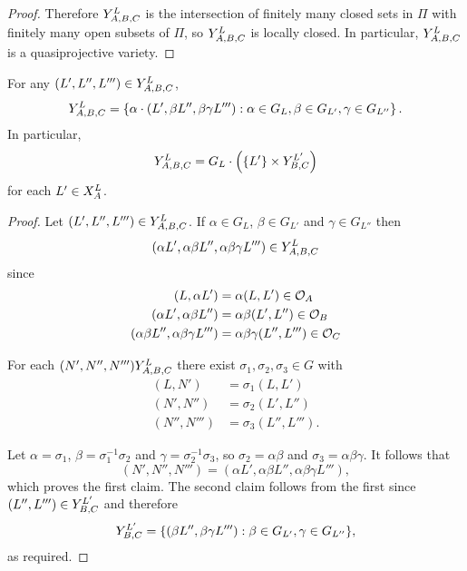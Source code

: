 \documentclass[a4paper, 11pt, twoside]{report}
\begin{document}
\begin{proof}
Therefore $\yprod[L]{A,B,C}$ is the intersection of finitely many closed sets in $\Pi$ with finitely many open subsets of $\Pi$, so $\yprod[L]{A,B,C}$ is locally closed. In particular, $\yprod[L]{A,B,C}$ is a quasiprojective variety.
\end{proof}

\begin{lemma}\label{lemma:y-triple-stabilisers}
For any $(L',L'',L''')\in\yprod[L]{A,B,C}$,
\begin{equation*}
\yprod[L]{A,B,C} = \left\{ \alpha\cdot (L',\beta L'',\beta\gamma L'''): \alpha\in G_L, \beta\in G_{L'}, \gamma\in G_{L''}\right\}.
\end{equation*}
In particular,
\begin{equation*}
\yprod[L]{A,B,C} = G_L\cdot\left(\{L'\}\times\yprod[L']{B,C}\right)
\end{equation*}
for each $L'\in\xprod[L]{A}$.
\end{lemma}

\begin{proof}
Let $(L',L'',L''')\in\yprod[L]{A,B,C}$. If $\alpha\in G_{L}$, $\beta\in G_{L'}$ and $\gamma\in G_{L''}$ then
\begin{equation*}
(\alpha L',\alpha\beta L'', \alpha\beta\gamma L''')\in\yprod[L]{A,B,C}
\end{equation*}
since
\begin{align*}
(L,\alpha L') &= \alpha (L,L')\in\orbit{A}\\
(\alpha L', \alpha\beta L'') &= \alpha\beta (L',L'')\in\orbit{B}\\
(\alpha\beta L'',\alpha\beta\gamma L''') &= \alpha\beta\gamma (L'',L''')\in\orbit{C}
\end{align*}

For each $(N',N'',N''')\yprod[L]{A,B,C}$ there exist $\sigma_1,\sigma_2,\sigma_3\in G$ with
\begin{align*}
(L,N') &= \sigma_1(L,L')\\
(N',N'') &= \sigma_2(L',L'')\\
(N'',N''') &= \sigma_3(L'',L''').
\end{align*}

Let $\alpha = \sigma_1$, $\beta = \sigma_1^{-1}\sigma_2$ and $\gamma = \sigma_2^{-1}\sigma_3$, so $\sigma_2=\alpha\beta$ and $\sigma_3=\alpha\beta\gamma$. It follows that
\begin{equation*}
(N',N'',N''') = (\alpha L',\alpha\beta L'', \alpha\beta\gamma L'''),
\end{equation*}
which proves the first claim. The second claim follows from the first since $(L'',L''')\in\yprod[L']{B,C}$ and therefore
\begin{equation*}
\yprod[L']{B,C} = \{(\beta L'',\beta\gamma L'''):\beta\in G_{L'}, \gamma\in G_{L''}\},
\end{equation*}
as required.
\end{proof}
\end{document}
